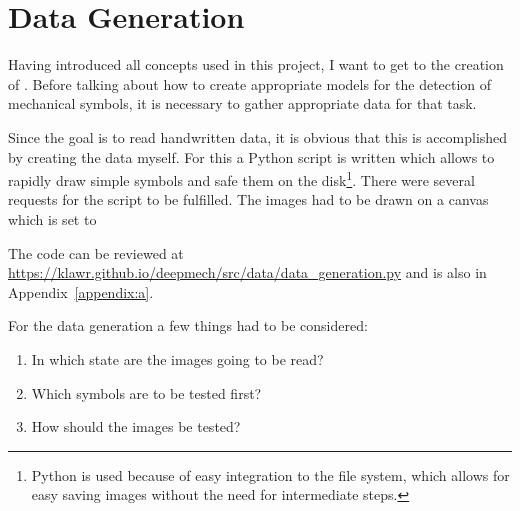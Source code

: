 \section{Data Generation}

Having introduced all concepts used in this project, I want to get to the creation of
. Before talking about how to create appropriate models for the detection of
mechanical symbols, it is necessary to gather appropriate data for that task.

Since the goal is to read handwritten data, it is obvious that this is accomplished by
creating the data myself. For this a Python script is written which allows to rapidly
draw simple symbols and safe them on the disk\footnote{ Python is used because of easy integration
to the file system, which allows for easy saving images without the need for intermediate
steps. }.
There were several requests for the script to be fulfilled. The images had to be drawn on a
canvas which is set to 

The code can be reviewed at \url{https://klawr.github.io/deepmech/src/data/data_generation.py}
and is also in Appendix~\ref{appendix:a}.

For the data generation a few things had to be considered:

\begin{enumerate}
\item In which state are the images going to be read?
\item Which symbols are to be tested first?
\item How should the images be tested?
\end{enumerate}
